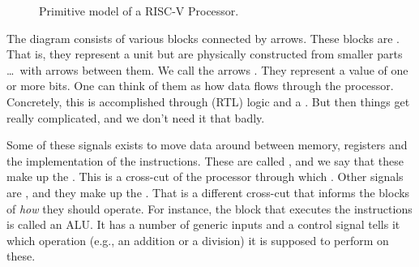 \begin{figure}[tbp]
  
  \caption{Primitive model of a RISC-V Processor.}
  \label{fig:machine:riscv}
\end{figure}

The diagram consists of various blocks connected by arrows. These blocks are . That is, they represent a  unit but are physically constructed from smaller parts \ldots\ with arrows between them. We call the arrows . They represent a value of one or more bits. One can think of them as how data flows through the processor. Concretely, this is accomplished through  (RTL) logic and a . But then things get really complicated, and we don't need it that badly.

Some of these signals exists to move data around between memory, registers and the implementation of the instructions. These are called , and we say that these make up the . This is a cross-cut of the processor through which . Other signals are , and they make up the . That is a different cross-cut that informs the blocks of \textsl{how} they should operate. For instance, the block that executes the instructions is called an ALU. It has a number of generic inputs and a control signal tells it which operation (e.g., an addition or a division) it is supposed to perform on these.

